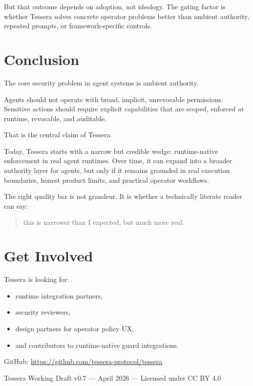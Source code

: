 \documentclass[11pt, a4paper]{article}
\begin{document}
But that outcome depends on adoption, not ideology. The gating factor is whether Tessera solves concrete operator problems better than ambient authority, repeated prompts, or framework-specific controls.

\section{Conclusion}

The core security problem in agent systems is ambient authority.

Agents should not operate with broad, implicit, unrevocable permissions. Sensitive actions should require explicit capabilities that are scoped, enforced at runtime, revocable, and auditable.

That is the central claim of Tessera.

Today, Tessera starts with a narrow but credible wedge: runtime-native enforcement in real agent runtimes. Over time, it can expand into a broader authority layer for agents, but only if it remains grounded in real execution boundaries, honest product limits, and practical operator workflows.

The right quality bar is not grandeur. It is whether a technically literate reader can say:

\begin{quote}
this is narrower than I expected, but much more real.
\end{quote}

\section{Get Involved}

Tessera is looking for:

\begin{itemize}
  \item runtime integration partners,
  \item security reviewers,
  \item design partners for operator policy UX,
  \item and contributors to runtime-native guard integrations.
\end{itemize}

\vspace{1.5em}
\begin{center}
  GitHub: \url{https://github.com/tessera-protocol/tessera}
\end{center}

\vfill
\begin{center}
  \small\color{gray}
  Tessera Working Draft v0.7 --- April 2026 --- Licensed under CC BY 4.0
\end{center}
\end{document}
